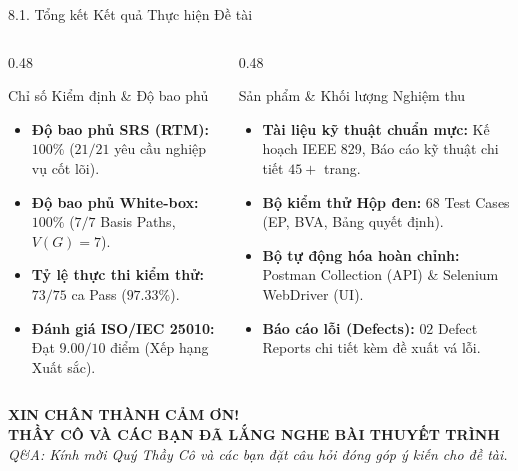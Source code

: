 \documentclass[aspectratio=169,10pt]{beamer}
\begin{document}
\begin{frame}{8.1. Tổng kết Kết quả Thực hiện Đề tài}
  \begin{columns}[T]
    \begin{column}{0.48\textwidth}
      \begin{block}{Chỉ số Kiểm định \& Độ bao phủ}
        \begin{itemize}
          \item \textbf{Độ bao phủ SRS (RTM):} $100\%$ ($21/21$ yêu cầu nghiệp vụ cốt lõi).
          \item \textbf{Độ bao phủ White-box:} $100\%$ ($7/7$ Basis Paths, $V(G)=7$).
          \item \textbf{Tỷ lệ thực thi kiểm thử:} $73/75$ ca Pass ($97.33\%$).
          \item \textbf{Đánh giá ISO/IEC 25010:} Đạt $9.00/10$ điểm (Xếp hạng Xuất sắc).
        \end{itemize}
      \end{block}
    \end{column}
    \begin{column}{0.48\textwidth}
      \begin{exampleblock}{Sản phẩm \& Khối lượng Nghiệm thu}
        \begin{itemize}
          \item \textbf{Tài liệu kỹ thuật chuẩn mực:} Kế hoạch IEEE 829, Báo cáo kỹ thuật chi tiết $45+$ trang.
          \item \textbf{Bộ kiểm thử Hộp đen:} $68$ Test Cases (EP, BVA, Bảng quyết định).
          \item \textbf{Bộ tự động hóa hoàn chỉnh:} Postman Collection (API) \& Selenium WebDriver (UI).
          \item \textbf{Báo cáo lỗi (Defects):} $02$ Defect Reports chi tiết kèm đề xuất vá lỗi.
        \end{itemize}
      \end{exampleblock}
    \end{column}
  \end{columns}
\end{frame}


\begin{frame}
  \centering
  \vspace{1cm}
  {\Huge\textbf{\textcolor{miotoblue}{XIN CHÂN THÀNH CẢM ƠN!}}}\\[0.5cm]
  {\Large\textbf{THẦY CÔ VÀ CÁC BẠN ĐÃ LẮNG NGHE BÀI THUYẾT TRÌNH}}\\[1cm]
  \textit{Q\&A: Kính mời Quý Thầy Cô và các bạn đặt câu hỏi đóng góp ý kiến cho đề tài.}
\end{frame}
\end{document}

